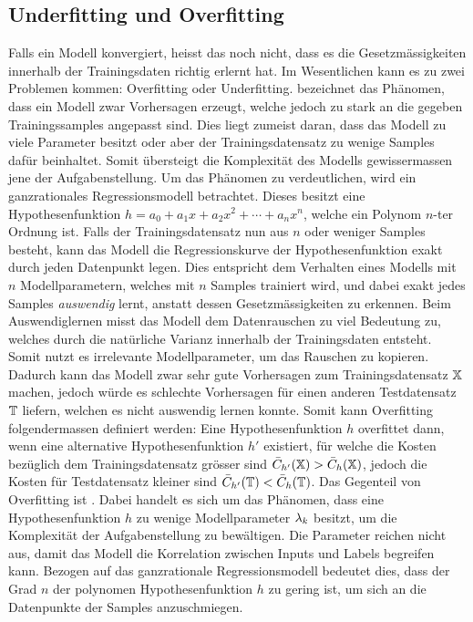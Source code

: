 \subsection{Underfitting und Overfitting}\label{sec:overfitting}
Falls ein Modell konvergiert, heisst das noch nicht, dass es die
Gesetzmässigkeiten innerhalb der Trainingsdaten richtig erlernt hat.
Im Wesentlichen kann es zu zwei Problemen kommen: Overfitting oder Underfitting.
\para{}
 bezeichnet das Phänomen, dass ein Modell zwar Vorhersagen
erzeugt, welche jedoch zu stark an die gegeben Trainingssamples angepasst sind.
Dies liegt zumeist daran, dass das Modell zu viele Parameter besitzt oder
aber der Trainingsdatensatz zu wenige Samples dafür beinhaltet.
Somit übersteigt die Komplexität des Modells gewissermassen jene der Aufgabenstellung.
\para{}
Um das Phänomen zu verdeutlichen, wird ein ganzrationales Regressionsmodell betrachtet.
Dieses besitzt eine Hypothesenfunktion $h = a_0 + a_1 x + a_2 x^2 + \cdots + a_n
x^n$, welche ein Polynom $n$-ter Ordnung ist. Falls der
Trainingsdatensatz nun aus $n$ oder weniger Samples besteht, kann das Modell die
Regressionskurve der Hypothesenfunktion exakt durch jeden Datenpunkt legen.
Dies entspricht dem Verhalten eines Modells mit $n$ Modellparametern, welches
mit $n$ Samples trainiert wird, und dabei exakt jedes Samples \textit{auswendig} lernt, anstatt
dessen Gesetzmässigkeiten zu erkennen.
\para{}
Beim Auswendiglernen misst das Modell dem Datenrauschen zu viel Bedeutung zu, welches durch die natürliche Varianz
innerhalb der Trainingsdaten entsteht. Somit nutzt es
irrelevante Modellparameter, um das Rauschen zu kopieren.
Dadurch kann das Modell zwar sehr gute Vorhersagen zum Trainingsdatensatz
$\mathbb{X}$ machen, jedoch würde es schlechte Vorhersagen für einen
anderen Testdatensatz $\mathbb{T}$ liefern, welchen es nicht auswendig lernen konnte.
\para{}
Somit kann Overfitting folgendermassen definiert werden: Eine
Hypothesenfunktion $h$ overfittet dann, wenn eine alternative Hypothesenfunktion
$h'$ existiert, für welche die Kosten bezüglich dem Trainingsdatensatz
grösser sind $\bar{C}_{h'}(\mathbb{X}) > \bar{C}_h(\mathbb{X})$, jedoch die Kosten
für Testdatensatz kleiner sind $\bar{C}_{h'}(\mathbb{T}) < \bar{C}_h(\mathbb{T})$.
\para{}
Das Gegenteil von Overfitting ist . Dabei handelt es sich um das Phänomen, dass eine
Hypothesenfunktion $h$ zu
wenige Modellparameter $\lambda_k$ besitzt, um die Komplexität der Aufgabenstellung zu bewältigen.
Die Parameter reichen nicht aus, damit das Modell die Korrelation zwischen
Inputs und Labels begreifen kann.
\para{}
Bezogen auf das ganzrationale Regressionsmodell bedeutet dies, dass der Grad $n$ der
polynomen Hypothesenfunktion $h$ zu gering ist, um sich an die Datenpunkte der
Samples anzuschmiegen.


